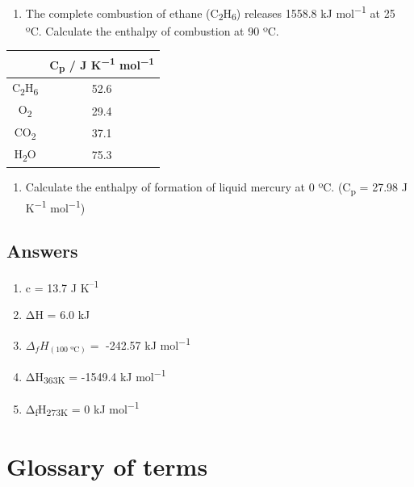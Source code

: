 \documentclass[
]{book}
\providecommand{\tightlist}{%
  \setlength{\itemsep}{0pt}\setlength{\parskip}{0pt}}
\begin{document}
\begin{enumerate}
\def\labelenumi{\arabic{enumi}.}
\setcounter{enumi}{3}
\tightlist
\item
  The complete combustion of ethane (C\textsubscript{2}H\textsubscript{6}) releases 1558.8 kJ mol\textsuperscript{−1} at 25 ºC. Calculate the enthalpy of combustion at 90 ºC.
\end{enumerate}

\begin{longtable}[]{@{}cc@{}}
\toprule
& C\textsubscript{p} / J K\textsuperscript{−1} mol\textsuperscript{−1}\tabularnewline
\midrule
\endhead
C\textsubscript{2}H\textsubscript{6} & 52.6\tabularnewline
O\textsubscript{2} & 29.4\tabularnewline
CO\textsubscript{2} & 37.1\tabularnewline
H\textsubscript{2}O & 75.3\tabularnewline
\bottomrule
\end{longtable}

\begin{enumerate}
\def\labelenumi{\arabic{enumi}.}
\setcounter{enumi}{4}
\tightlist
\item
  Calculate the enthalpy of formation of liquid mercury at 0 ºC. (C\textsubscript{p} = 27.98 J K\textsuperscript{−1} mol\textsuperscript{−1})
\end{enumerate}

\hypertarget{answers}{%
\section{Answers}\label{answers}}

\begin{enumerate}
\def\labelenumi{\arabic{enumi}.}
\tightlist
\item
  c = 13.7 J K\textsuperscript{--1}
\item
  ΔH = 6.0 kJ
\item
  \(\Delta _f H _{(\textrm{100 ºC})}=\) -242.57 kJ mol\textsuperscript{−1}
\item
  ΔH\textsubscript{363K} = -1549.4 kJ mol\textsuperscript{−1}
\item
  Δ\textsubscript{f}H\textsubscript{273K} = 0 kJ mol\textsuperscript{−1}
\end{enumerate}

\hypertarget{glossary-of-terms}{%
\chapter*{Glossary of terms}\label{glossary-of-terms}}
\end{document}
